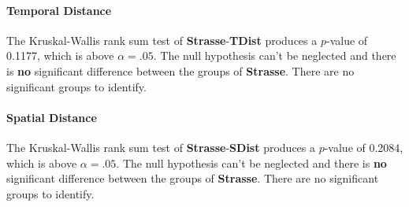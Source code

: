 \paragraph{Temporal Distance}
The Kruskal-Wallis rank sum test of \textbf{Strasse}-\textbf{TDist} produces a $p$-value of 0.1177, which is above $\alpha=.05$. The null hypothesis can't be neglected and there is \textbf{no} significant difference between the groups of \textbf{Strasse}. There are no significant groups to identify.

\paragraph{Spatial Distance}
The Kruskal-Wallis rank sum test of \textbf{Strasse}-\textbf{SDist} produces a $p$-value of 0.2084, which is above $\alpha=.05$. The null hypothesis can't be neglected and there is \textbf{no} significant difference between the groups of \textbf{Strasse}. There are no significant groups to identify.

